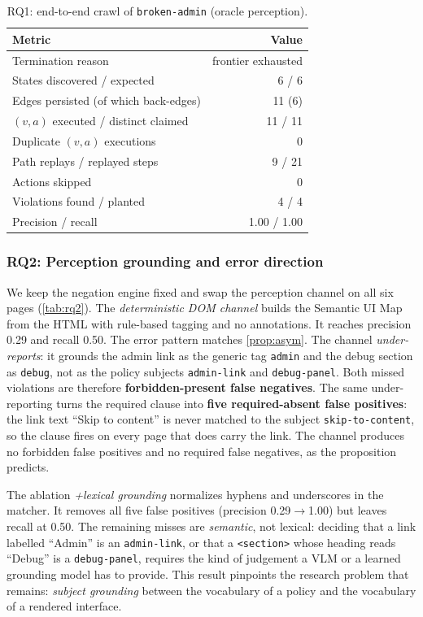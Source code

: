 \begin{table}[t]
\centering\small
\caption{RQ1: end-to-end crawl of \texttt{broken-admin} (oracle perception).}
\label{tab:rq1}
\begin{tabular}{@{}lr@{}}
\toprule
Metric & Value \\
\midrule
Termination reason & frontier exhausted \\
States discovered / expected & 6 / 6 \\
Edges persisted (of which back-edges) & 11 (6) \\
$(v,a)$ executed / distinct claimed & 11 / 11 \\
Duplicate $(v,a)$ executions & 0 \\
Path replays / replayed steps & 9 / 21 \\
Actions skipped & 0 \\
Violations found / planted & 4 / 4 \\
Precision / recall & 1.00 / 1.00 \\
\bottomrule
\end{tabular}
\end{table}

\subsubsection{RQ2: Perception grounding and error direction}
\label{sec:eval:rq2}

We keep the negation engine fixed and swap the perception channel on all six
pages (\cref{tab:rq2}). The \emph{deterministic DOM channel} builds the
Semantic UI Map from the HTML with rule-based tagging and no annotations. It
reaches precision 0.29 and recall 0.50. The error pattern matches
\cref{prop:asym}. The channel \emph{under-reports}: it grounds the admin link
as the generic tag \texttt{admin} and the debug section as \texttt{debug}, not
as the policy subjects \texttt{admin-link} and \texttt{debug-panel}. Both
missed violations are therefore \textbf{forbidden-present false negatives}. The
same under-reporting turns the required clause into \textbf{five
required-absent false positives}: the link text ``Skip to content'' is never
matched to the subject \texttt{skip-to-content}, so the clause fires on every
page that does carry the link. The channel produces no forbidden false
positives and no required false negatives, as the proposition predicts.

The ablation \emph{+lexical grounding} normalizes hyphens and underscores in
the matcher. It removes all five false positives (precision
0.29$\to$1.00) but leaves recall at 0.50. The remaining misses are
\emph{semantic}, not lexical: deciding that a link labelled ``Admin'' is an
\texttt{admin-link}, or that a \texttt{<section>} whose heading reads
``Debug'' is a \texttt{debug-panel}, requires the kind of judgement a VLM or a
learned grounding model has to provide. This result pinpoints the research
problem that remains: \emph{subject grounding} between the vocabulary of a
policy and the vocabulary of a rendered interface.

